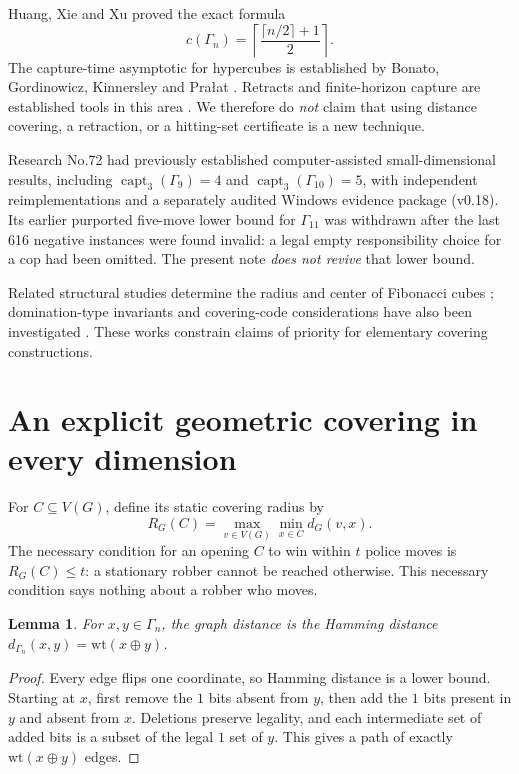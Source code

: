 \documentclass[10pt]{article}
\newtheorem{lemma}[theorem]{Lemma}
\newcommand{\Ga}{\Gamma}
\newcommand{\capt}{\operatorname{capt}}
\begin{document}
Huang, Xie and Xu proved the exact formula \cite{hxx2026}
\begin{equation}\label{eq:cop}
 c(\Ga_n)=\left\lceil\frac{\lceil n/2\rceil+1}{2}\right\rceil.
\end{equation}
The capture-time asymptotic for hypercubes is established by
Bonato, Gordinowicz, Kinnersley and Pra\l at \cite{bgkp2013}.
Retracts and finite-horizon capture are established tools in this area
\cite{bonato2009,over2016}. We therefore do \emph{not} claim that using
distance covering, a retraction, or a hitting-set certificate is a new technique.

Research No.72 had previously established computer-assisted small-dimensional
results, including $\capt_3(\Ga_9)=4$ and $\capt_3(\Ga_{10})=5$,
with independent reimplementations and a separately audited Windows evidence
package (v0.18). Its earlier purported five-move lower bound for $\Ga_{11}$
was withdrawn after the last 616 negative instances were found invalid:
a legal empty responsibility choice for a cop had been omitted. The present
note \emph{does not revive} that lower bound.

Related structural studies determine the radius and center of Fibonacci cubes \cite{munarini2002}; domination-type invariants and covering-code considerations have also been investigated \cite{azarija2018}. These works constrain claims of priority for elementary covering constructions.\par\smallskip

\section{An explicit geometric covering in every dimension}
For $C\subseteq V(G)$, define its static covering radius by
\[
 R_G(C)=\max_{v\in V(G)}\min_{x\in C}d_G(v,x).
\]
The necessary condition for an opening $C$ to win within $t$ police
moves is $R_G(C)\le t$: a stationary robber cannot be reached otherwise.
This necessary condition says nothing about a robber who moves.

\begin{lemma}\label{lem:metric}
For $x,y\in\Ga_n$, the graph distance is the Hamming distance
$d_{\Ga_n}(x,y)=\mathrm{wt}(x\oplus y)$.
\end{lemma}
\begin{proof}
Every edge flips one coordinate, so Hamming distance is a lower bound.
Starting at $x$, first remove the $1$ bits absent from $y$, then add the
$1$ bits present in $y$ and absent from $x$. Deletions preserve legality,
and each intermediate set of added bits is a subset of the legal $1$ set
of $y$. This gives a path of exactly $\mathrm{wt}(x\oplus y)$ edges.
\end{proof}
\end{document}
